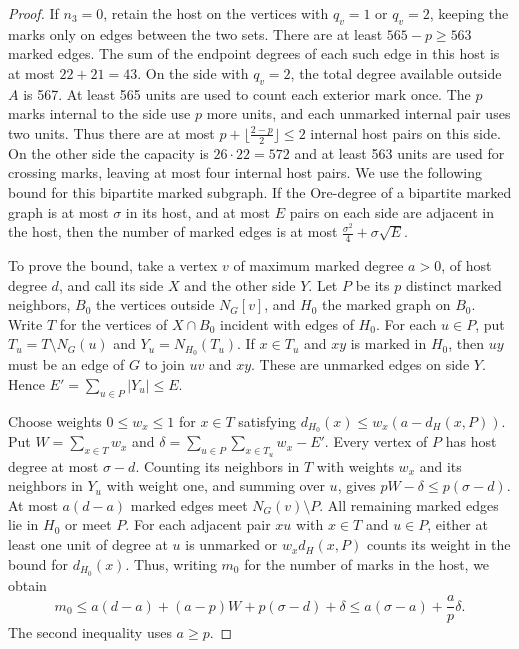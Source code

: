 \begin{proof}
If $n_3=0$, retain the host on the vertices with $q_v=1$
or $q_v=2$, keeping the marks only on edges between the
two sets. There are at least $565-p\ge563$ marked
edges. The sum of the endpoint degrees of each such edge in this
host is at most $22+21=43$.
On the side with $q_v=2$, the total degree available
outside $A$ is 567. At least 565 units are used to
count each exterior mark once. The $p$ marks internal
to the side use $p$ more units, and each unmarked
internal pair uses two units. Thus there are at most
$p+\lfloor\frac{2-p}{2}\rfloor\le2$ internal host pairs
on this side. On the other side the capacity is
$26\cdot22=572$ and at least 563 units are used for
crossing marks, leaving at most four internal host
pairs. We use the following bound for this bipartite marked
subgraph. If the Ore-degree of a bipartite marked graph is at most
$\sigma$ in its host, and at most $E$ pairs on each side are adjacent
in the host, then the number of marked edges is at most
$\frac{\sigma^2}{4}+\sigma\sqrt{E}$.

To prove the bound, take a vertex $v$ of maximum marked degree $a>0$,
of host degree $d$, and call its side $X$ and the other side $Y$.
Let $P$ be its $p$ distinct marked neighbors, $B_0$ the vertices
outside $N_G[v]$, and $H_0$ the marked graph on $B_0$.
Write $T$ for the vertices of $X\cap B_0$ incident with edges
of $H_0$. For each $u\in P$, put $T_u=T\setminus N_G(u)$ and
$Y_u=N_{H_0}(T_u)$. If $x\in T_u$ and $xy$ is marked in $H_0$,
then $uy$ must be an edge of $G$ to join $uv$ and $xy$. These are
unmarked edges on side $Y$. Hence $E'=\sum_{u\in P}|Y_u|\leq E$.

Choose weights $0\leq w_x\leq1$ for $x\in T$ satisfying
$d_{H_0}(x)\leq w_x(a-d_H(x,P))$. Put $W=\sum_{x\in T}w_x$
and $\delta=\sum_{u\in P}\sum_{x\in T_u}w_x-E'$.
Every vertex of $P$ has host degree at most $\sigma-d$.
Counting its neighbors in $T$ with weights $w_x$ and its neighbors
in $Y_u$ with weight one, and summing over $u$, gives
$pW-\delta\leq p(\sigma-d)$.
At most $a(d-a)$ marked edges meet $N_G(v)\setminus P$.
All remaining marked edges lie in $H_0$ or meet $P$.
For each adjacent pair $xu$ with $x\in T$ and $u\in P$,
either at least one unit of degree at $u$ is unmarked or
$w_x d_H(x,P)$ counts its weight in the bound for $d_{H_0}(x)$.
Thus, writing $m_0$ for the number of marks in the host, we obtain
\[
 m_0\leq a(d-a)+(a-p)W+p(\sigma-d)+\delta
 \leq a(\sigma-a)+\frac{a}{p}\delta.
\]
The second inequality uses $a\geq p$.


\end{proof}
